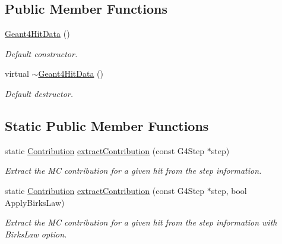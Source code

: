 \subsection*{Public Member Functions}
\begin{DoxyCompactItemize}
\item 
\hyperlink{class_d_d4hep_1_1_simulation_1_1_geant4_hit_data_a720c9f6193739b3ce4f23c321a4af1be}{Geant4HitData} ()
\begin{DoxyCompactList}\small\item\em Default constructor. \item\end{DoxyCompactList}\item 
virtual \hyperlink{class_d_d4hep_1_1_simulation_1_1_geant4_hit_data_a57540b8795c4a198a0925773269d99f3}{$\sim$Geant4HitData} ()
\begin{DoxyCompactList}\small\item\em Default destructor. \item\end{DoxyCompactList}\end{DoxyCompactItemize}
\subsection*{Static Public Member Functions}
\begin{DoxyCompactItemize}
\item 
static \hyperlink{class_d_d4hep_1_1_simulation_1_1_geant4_hit_data_1_1_monte_carlo_contrib}{Contribution} \hyperlink{class_d_d4hep_1_1_simulation_1_1_geant4_hit_data_aa05fcd729fd401c61e2fa7a48887efc5}{extractContribution} (const G4Step $\ast$step)
\begin{DoxyCompactList}\small\item\em Extract the MC contribution for a given hit from the step information. \item\end{DoxyCompactList}\item 
static \hyperlink{class_d_d4hep_1_1_simulation_1_1_geant4_hit_data_1_1_monte_carlo_contrib}{Contribution} \hyperlink{class_d_d4hep_1_1_simulation_1_1_geant4_hit_data_a53b06813612ad68f26dc3ad1ca2662b3}{extractContribution} (const G4Step $\ast$step, bool ApplyBirksLaw)
\begin{DoxyCompactList}\small\item\em Extract the MC contribution for a given hit from the step information with BirksLaw option. \item\end{DoxyCompactList}\end{DoxyCompactItemize}
